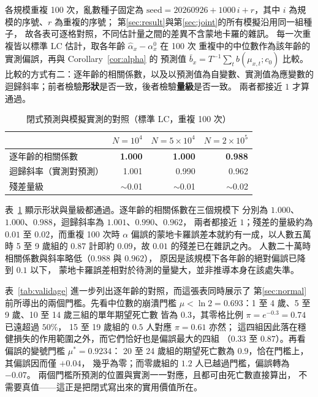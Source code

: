 \documentclass[UTF8, fontset=macnew, a4paper, 12pt]{ctexart}
\begin{document}
各規模重複 100 次，亂數種子固定為
$\text{seed}=20260926+1000\,i+r$，其中 $i$ 為規模的序號、$r$ 為重複的序號；
第\ref{sec:result}與第\ref{sec:joint}的所有模擬沿用同一組種子，
故各表可逐格對照，不同估計量之間的差異不含蒙地卡羅的雜訊。
每一次重複皆以標準 LC 估計，取各年齡 $\hat\alpha_x-\alpha^{0}_x$ 在 100 次
重複中的中位數作為該年齡的實測偏誤，再與 Corollary~\ref{cor:alpha} 的
預測值 $\bar b_x=T^{-1}\sum_t b(\mu_{x,t};c_0)$ 比較。
比較的方式有二：逐年齡的相關係數，以及以預測值為自變數、實測值為應變數的
迴歸斜率；前者檢驗\textbf{形狀}是否一致，後者檢驗\textbf{量級}是否一致。
兩者都接近 $1$ 才算通過。

\begin{table}[H]
\centering
\caption{閉式預測與模擬實測的對照（標準 LC，重複 100 次）}
\small
\begin{tabular}{lrrr}
\toprule
 & $N=10^4$ & $N=5\times10^4$ & $N=2\times10^5$\\
\midrule
逐年齡的相關係數 & \textbf{1.000} & \textbf{1.000} & \textbf{0.988}\\
迴歸斜率（實測對預測） & 1.001 & 0.990 & 0.962\\
殘差量級 & $\sim$0.01 & $\sim$0.01 & $\sim$0.02\\
\bottomrule
\end{tabular}
\label{tab:valid}
\end{table}

表~\ref{tab:valid} 顯示形狀與量級都通過。逐年齡的相關係數在三個規模下
分別為 $1.000$、$1.000$、$0.988$，迴歸斜率為 $1.001$、$0.990$、$0.962$，
兩者都接近 $1$；殘差的量級約為 $0.01$ 至 $0.02$，而重複 100 次時
$\alpha$ 偏誤的蒙地卡羅誤差本就約有一成，以人數五萬時 5 至 9 歲組的
$0.87$ 計即約 $0.09$，故 $0.01$ 的殘差已在雜訊之內。
人數二十萬時相關係數與斜率略低（$0.988$ 與 $0.962$），
原因是該規模下各年齡的絕對偏誤已降到 $0.1$ 以下，
蒙地卡羅誤差相對於待測的量變大，並非推導本身在該處失準。

表~\ref{tab:validage} 進一步列出逐年齡的對照，而這張表同時展示了
第\ref{sec:normal}前所導出的兩個門檻。先看中位數的崩潰門檻
$\mu<\ln2=0.693$：1 至 4 歲、5 至 9 歲、10 至 14 歲三組的單年期望死亡數
皆為 $0.3$，其零格比例 $\pi=e^{-0.3}=0.74$ 已遠超過 $50\%$，
15 至 19 歲組的 $0.5$ 人對應 $\pi=0.61$ 亦然；
這四組因此落在穩健損失的作用範圍之外，而它們恰好也是偏誤最大的四組
（$0.33$ 至 $0.87$）。再看偏誤的變號門檻 $\mu^\ast=0.9234$：
20 至 24 歲組的期望死亡數為 $0.9$，恰在門檻上，其偏誤因而僅 $+0.04$，
幾乎為零；而零歲組的 $1.2$ 人已越過門檻，偏誤轉為 $-0.07$。
兩個門檻所預測的位置與實測一一對應，且都可由死亡數直接算出，
不需要真值——這正是把閉式寫出來的實用價值所在。
\end{document}
